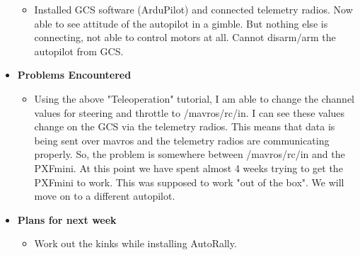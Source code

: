 \documentclass{article}
\begin{document}
\begin{itemize}
\begin{itemize}
        \item Installed GCS software (ArduPilot) and connected telemetry radios. Now able to see attitude of the autopilot in a gimble. But nothing else is connecting, not able to control motors at all. Cannot disarm/arm the autopilot from GCS.
    \end{itemize}

    \item {\textbf{Problems Encountered}}
    \begin{itemize}
        \item Using the above "Teleoperation" tutorial, I am able to change the channel values for steering and throttle to /mavros/rc/in. I can see these values change on the GCS via the telemetry radios. This means that data is being sent over mavros and the telemetry radios are communicating properly. So, the problem is somewhere between /mavros/rc/in and the PXFmini. At this point we have spent almost 4 weeks trying to get the PXFmini to work. This was supposed to work "out of the box". We will move on to a different autopilot.
    \end{itemize}

    \item{\textbf{Plans for next week}}
    \begin{itemize}
        \item Work out the kinks while installing AutoRally.
    \end{itemize}
\end{itemize}
\end{document}
